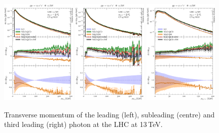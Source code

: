 \begin{figure}[t!]
  \centering
  \includegraphics[width=0.32\textwidth]{figs_aaz/pT_y1}
  \includegraphics[width=0.32\textwidth]{figs_aaz/pT_y2}
  \includegraphics[width=0.32\textwidth]{figs_aaz/pT_l1l2}
  \caption{
    Transverse momentum of the leading (left), subleading (centre) 
    and third leading (right) photon at the LHC at 13\,TeV.
    \label{fig:aaz:pt}
  }
\end{figure}

